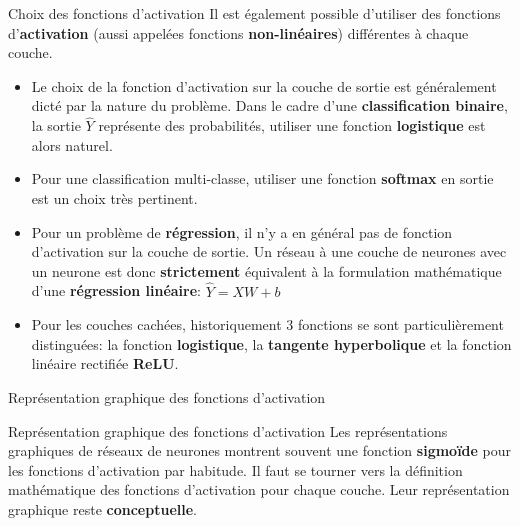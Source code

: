 \begin{frame}{Choix des fonctions d'activation}
	Il est également possible d'utiliser des fonctions d'\textbf{activation} (aussi appelées fonctions \textbf{non-linéaires}) différentes à chaque couche.
	\begin{itemize}
		\item Le choix de la fonction d'activation sur la couche de sortie est généralement dicté par la nature du problème. Dans le cadre d'une \textbf{classification binaire}, la sortie $\hat{Y}$ représente des probabilités, utiliser une fonction \textbf{logistique} est alors naturel.
		\pause
		\item Pour une classification multi-classe, utiliser une fonction \textbf{softmax} en sortie est un choix très pertinent. 
		\pause
		\item Pour un problème de \textbf{régression}, il n'y a en général pas de fonction d'activation sur la couche de sortie. Un réseau à une couche de neurones avec un neurone est donc \textbf{strictement} équivalent à la formulation mathématique d'une \textbf{régression linéaire}: $\hat{Y} = XW + b$
		\pause
		\item Pour les couches cachées, historiquement 3 fonctions se sont particulièrement distinguées: la fonction \textbf{logistique}, la \textbf{tangente hyperbolique} et la fonction linéaire rectifiée \textbf{ReLU}.
	\end{itemize}
\end{frame}

\begin{frame}{Représentation graphique des fonctions d'activation}
	\begin{alertblock}{Représentation graphique des fonctions d'activation}
		Les représentations graphiques de réseaux de neurones montrent souvent une fonction \textbf{sigmoïde} pour les fonctions d'activation par habitude. Il faut se tourner vers la définition mathématique des fonctions d'activation pour chaque couche. Leur représentation graphique reste \textbf{conceptuelle}.	
	\end{alertblock}
\end{frame}

